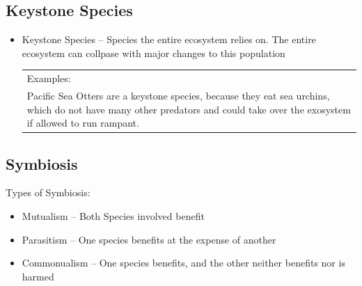 \documentclass{article}
\begin{document}
\subsection{Keystone Species}
\begin{itemize}
\item Keystone Species -- Species the entire ecosystem relies on. The entire ecosystem can collpase with major changes to this population\\
\begin{tabular}{| p{10cm}}
Examples:\\
Pacific Sea Otters are a keystone species,  because they eat sea urchins, which do not have many other predators and could take over the exosystem if allowed to run rampant.
\end{tabular}
\end{itemize}

\subsection{Symbiosis}
Types of Symbiosis:
\begin{itemize}
\item Mutualism -- Both Species involved benefit
\item Parasitism -- One species benefits at the expense of another
\item Commonualism -- One species benefits, and the other neither benefits nor is harmed
\end{itemize}
\end{document}
